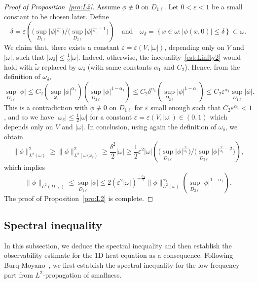 \documentclass[a4paper,reqno]{amsart}
\theoremstyle{definition}
\numberwithin{equation}{section}
\begin{document}
\begin{proof}[Proof of Proposition~\ref{pro:L2}]
Assume $\phi \not\equiv 0$ on $D_{1\ell}$.
Let $0<\varepsilon<1$ be a small constant to be chosen later. Define 
\begin{equation*}
\delta=\varepsilon\left(\big(\sup\limits_{D_{1\ell}}|\phi|^{\frac{1}{\alpha_{1}}}\big)/\big(\sup\limits_{D_{2\ell}}|\phi|^{\frac{1}{\alpha_{1}}-1}\big)\right)\quad \mbox{and}\quad 
\omega_{\delta}=\left\{x\in \omega:|\phi(x,0)|\le \delta\right\}\subset \omega.
\end{equation*}
We claim that, there exists a constant $\varepsilon=\varepsilon(V,|\omega|)$, depending only on $V$ and $|\omega|$, such that $|\omega_{\delta}|\le \frac{1}{2}|\omega|$. Indeed, otherwise, the inequality~\eqref{est:Linfty2} would hold with $\widetilde{\omega}$ replaced by $\omega_{\delta}$ (with same constants $\alpha_{1}$ and $C_{2}$). Hence, from the definition of $\omega_{\delta}$,
\begin{equation*}
\sup_{D_{1\ell}}|\phi|\le C_{2}\left(\sup_{\omega_{\delta}}|\phi|^{\alpha_{1}}\right)
\left(\sup_{D_{2\ell}}|\phi|^{1-\alpha_{1}}\right)
\le C_{2}\delta^{\alpha_{1}}
\left(\sup_{D_{2\ell}}|\phi|^{1-\alpha_{1}}\right)
\le C_{2}\varepsilon^{\alpha_{1}}\sup_{D_{1\ell}}|\phi|.
\end{equation*}
This is a contradiction with $\phi\not\equiv 0$ on $D_{1\ell}$ for $\varepsilon$ small enough such that $C_{2}\varepsilon^{\alpha_{1}}<1$, and so we have $|\omega_{\delta}|\le \frac{1}{2}|\omega|$ for a constant $\varepsilon=\varepsilon(V,|\omega|)\in (0,1)$ which depends only on $V$ and $|\omega|$. In conclusion, using again the definition of $\omega_{\delta}$, we obtain
\begin{equation*}
\|\phi\|^{2}_{L^{2}(\omega)}\ge \|\phi\|^{2}_{L^{2}(\omega\setminus \omega_{\delta})}
\ge \frac{\delta^{2}}{2}|\omega|\ge \frac{1}{2}\varepsilon^{2}|\omega|\left(\big(\sup\limits_{D_{1\ell}}|\phi|^{\frac{2}{\alpha_{1}}}\big)/\big(\sup\limits_{D_{2\ell}}|\phi|^{\frac{2}{\alpha_{1}}-2}\big)\right),
\end{equation*}
which implies
\begin{equation*}
   \|\phi\|_{L^{2}(D_{1\ell})}\le \sup_{D_{1\ell}}|\phi|\le 2(\varepsilon^{2}|\omega|)^{-\frac{\alpha_{1}}{2}}\|\phi\|_{L^{2}(\omega)}^{\alpha_{1}}\left(\sup_{D_{2\ell}}|\phi|^{1-\alpha_{1}}\right).
\end{equation*}
The proof of Proposition~\ref{pro:L2} is complete.
\end{proof}

\subsection{Spectral inequality}\label{SS:LOW}
In this subsection, we deduce the spectral inequality and then establish the observability estimate for the 1D heat equation as a consequence.  Following Burq-Moyano~\cite{BurqMoyano}, we first establish the spectral inequality for the low-frequency part from $L^{2}$-propagation of smallness.
\end{document}
